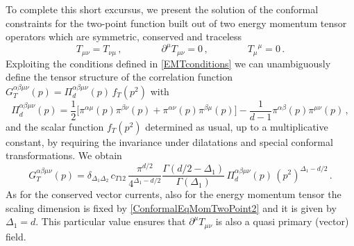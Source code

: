 \documentclass[a4paper,11pt,openright,twoside]{book}
\numberwithin{equation}{section}
\begin{document}
%
To complete this short excursus, we present the solution of the conformal constraints for the two-point function built out of two energy momentum tensor operators which are symmetric, conserved and traceless
%
\begin{equation}
	\label{EMTconditions}
	T_{\mu\nu} = T_{\nu\mu} \,, \qquad \qquad \partial^{\mu} T_{\mu\nu} = 0 \,, \qquad \qquad {T_{\mu}}^{\mu} = 0 \,.
\end{equation}
Exploiting the conditions defined in \eqref{EMTconditions} we can unambiguously define the tensor structure of the correlation 
function $G^{\alpha\beta\mu\nu}_T(p) = \Pi_{d}^{\alpha\beta\mu\nu}(p) \, f_T(p^2)$ with
%
\begin{equation}
	\label{TT}
	\Pi^{\alpha\beta\mu\nu}_{d}(p) = \frac{1}{2} \bigg[ \pi^{\alpha\mu}(p) \pi^{\beta\nu}(p) + \pi^{\alpha\nu}(p) \pi^{\beta\mu}(p) 
	\bigg] 
	- \frac{1}{d-1} \pi^{\alpha\beta}(p) \pi^{\mu\nu}(p) \,,
\end{equation}
%
and the scalar function $f_T(p^2)$ determined as usual, up to a multiplicative constant, by requiring the invariance under 
dilatations and special conformal transformations. We obtain
%
\begin{equation}
	\label{TwoPointEmt}
	G^{\alpha\beta\mu\nu}_T(p) = \delta_{\Delta_1 \Delta_2}  \, 
	c_{T 12}\,\frac{\pi^{d/2}}{4^{\Delta_1 - d/2}} \frac{\Gamma(d/2 - \Delta_1)}{\Gamma(\Delta_1)}\, 
	\Pi^{\alpha\beta\mu\nu}_{d}(p) \, (p^2)^{\Delta_1 - d/2} \,.
\end{equation}
%
As for the conserved vector currents, also for the energy momentum tensor the scaling dimension is fixed by \eqref{ConformalEqMomTwoPoint2}
and it is given by $\Delta_1 = d$. This particular value ensures that $\partial^\mu T_{\mu\nu}$ is also a quasi primary (vector) field. 
\end{document}
